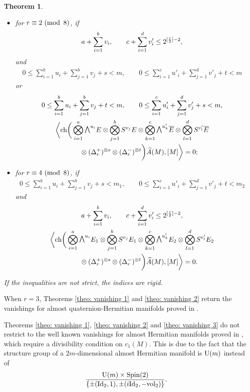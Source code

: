 \documentclass[10pt,a4paper]{amsart}
\newcommand{\A}{\mbox{$\widehat A$}}
\newcommand{\ext}{\raise1pt\hbox{$\textstyle\bigwedge$}}
\newcommand{\sym}{S}
\newcommand{\ch}{\mbox{\rm ch}}
\numberwithin{equation}{section}
\newtheorem{Theorem}{Theorem}[section]
\begin{document}
\begin{Theorem}
\begin{itemize}
 \item for $r\equiv 2 \,\,({\rm mod\,\,\,} 8)$, if
 \begin{gather*}
 a + \sum_{i=1}^b v_i,\qquad c + \sum_{i=1}^d v'_i \leq 2^{[{r\over 2}]-2},\end{gather*}
and
 \begin{gather*}
 0\leq \sum_{i=1}^b u_i+\sum_{j=1}^b v_j+s<m,\qquad 0 \leq \sum_{i=1}^c u'_i+\sum_{j=1}^d v'_j+t <m
 \end{gather*}
 or
 \begin{gather*}
 0\leq \sum_{i=1}^b u_i+\sum_{j=1}^b v_j+t<m,\qquad 0 \leq \sum_{i=1}^c u'_i+\sum_{j=1}^d v'_j+s <m, \\
 \bigg\langle \ch\bigg(\bigotimes_{i=1}^a\ext^{u_i}E\otimes\bigotimes_{j=1}^b\sym^{v_j} E
 \otimes\bigotimes_{k=1}^c \ext^{u'_k}\overline{E}\otimes\bigotimes_{l=1}^d\sym^{v'_l} \overline{E} \\
 \qquad{} \otimes (\Delta_r^+)^{\otimes s}\otimes (\Delta_r^-)^{\otimes t} \bigg)
 \A(M),[M]\bigg\rangle =0;\end{gather*}

 \item for $r\equiv 4 \,\,({\rm mod\,\,\,} 8)$, if
 \begin{gather*}
 0\leq \sum_{i=1}^b u_i+\sum_{j=1}^b v_j+s<m_1,\qquad 0\leq \sum_{i=1}^c u'_i+\sum_{j=1}^d v'_j+t <m_2
 \end{gather*}
 and
 \begin{gather*}
 a + \sum_{i=1}^b v_i,\qquad c + \sum_{i=1}^d v'_i\leq 2^{[{r\over 2}]-2},
 \\
 \bigg\langle \ch\bigg(\bigotimes_{i=1}^a\ext^{u_i}E_1\otimes\bigotimes_{j=1}^b\sym^{v_j} E_1 \otimes
 \bigotimes_{k=1}^c\ext^{u'_k}E_2\otimes\bigotimes_{l=1}^d\sym^{v'_l} E_2 \\
 \qquad{} \otimes(\Delta_r^+)^{\otimes s}\otimes(\Delta_r^-)^{\otimes t} \bigg) \A(M),[M]\bigg\rangle =0.\end{gather*}
 \end{itemize}
 If the inequalities are not strict, the indices are rigid.
 \end{Theorem}

\begin{Remark}When $r=3$, Theorems \ref{theo: vanishing 1} and \ref{theo: vanishing 2} return the vanishings for almost quaternion-Hermitian manifolds proved in \cite{Herrera-Herrera}.
\end{Remark}

\begin{Remark} Theorems \ref{theo: vanishing 1}, \ref{theo: vanishing 2} and \ref{theo: vanishing 3} do not restrict to the well known vanishings for almost Hermitian manifolds proved in \cite{Hattori}, which require a divisibility condition on $c_1(M)$. This is due to the fact that the structure group of a $2m$-dimensional almost Hermitian manifold is ${\rm U}(m)$ instead of
\begin{gather*}{{\rm U}(m)\times {\rm Spin}(2)\over \{\pm({\rm Id}_2,1),\pm(i{\rm Id}_2,-{\rm vol}_2)\}}.\end{gather*}
\end{Remark}
\end{document}

